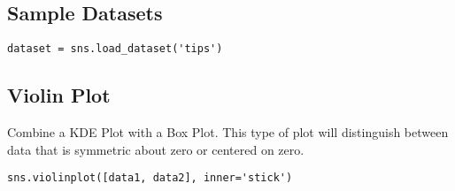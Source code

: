 \subsection{Sample Datasets}

\begin{lstlisting}
dataset = sns.load_dataset('tips')
\end{lstlisting}

\subsection{Violin Plot}
Combine a KDE Plot with a Box Plot. This type of plot will distinguish between
data that is symmetric about zero or centered on zero.

\begin{lstlisting}
sns.violinplot([data1, data2], inner='stick')
\end{lstlisting}
